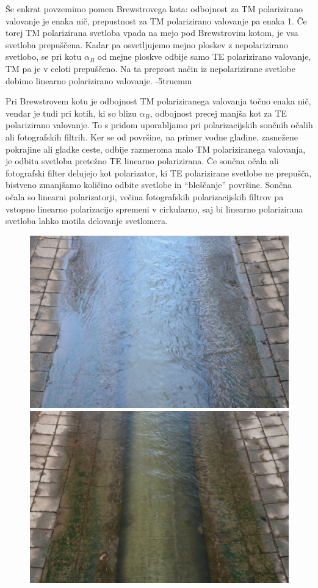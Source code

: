 Še enkrat povzemimo pomen Brewstrovega kota: odbojnost za TM polarizirano
valovanje je enaka nič, prepustnost za TM polarizirano valovanje pa enaka 1. Če 
torej TM polarizirana svetloba vpada na mejo pod Brewstrovim kotom, je vsa svetloba
prepuščena. Kadar pa osvetljujemo mejno ploskev z nepolarizirano svetlobo, se 
pri kotu $\alpha_B$ od mejne ploskve odbije samo TE polarizirano
valovanje, TM pa je v celoti prepuščeno. Na ta preprost način
iz nepolarizirane svetlobe dobimo linearno polarizirano valovanje.
\vglue-5truemm
\begin{remark}
Pri Brewstrovem kotu je odbojnost TM polariziranega valovanja točno 
enaka nič, vendar je tudi pri kotih, ki so blizu $\alpha_B$, 
odbojnost precej manjša kot za TE polarizirano valovanje. 
To s pridom uporabljamo pri polarizacijskih sončnih očalih ali fotografskih
filtrih. Ker se od površine, na primer vodne gladine, zasnežene pokrajine
ali gladke ceste, odbije razmeroma malo TM polariziranega valovanja, 
je odbita svetloba pretežno TE linearno polarizirana. Če sončna
očala ali fotografski filter delujejo kot polarizator, ki TE polarizirane 
svetlobe ne prepušča, bistveno zmanjšamo količino odbite svetlobe in 
``bleščanje'' površine. Sončna očala so linearni polarizatorji, večina 
fotografskih polarizacijskih filtrov pa vstopno linearno polarizacijo spremeni
v cirkularno, saj bi linearno polarizirana svetloba lahko motila delovanje svetlomera.
\begin{figure}[ht]
\centering
\includegraphics[width=7truecm]{slike/04_photos_voda1.jpg}\hfill
\includegraphics[width=7truecm]{slike/04_photos_voda2.jpg}

\end{figure}
\end{remark}
